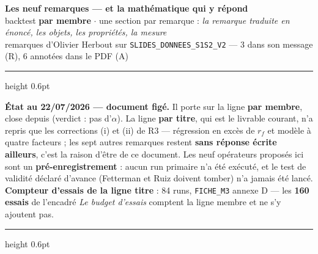 \documentclass[11pt,a4paper]{article}
\begin{document}
\begin{center}
{\LARGE\bfseries Les neuf remarques --- et la mathématique qui y répond}\\[1mm]
{\normalsize backtest \textbf{par membre} $\cdot$ une section par remarque : \emph{la remarque traduite en énoncé, les objets, les propriétés, la mesure}}\\[0.5mm]
{\small\color{grisf} remarques d'Olivier Herbout sur \texttt{SLIDES\_DONNEES\_S1S2\_V2} --- 3 dans son message (R), 6 annotées dans le PDF (A)}
\end{center}

\vspace{0.5mm}
\hrule height 0.6pt
\vspace{1mm}
{\footnotesize\color{grisf}\textbf{État au 22/07/2026 --- document figé.} Il porte sur la ligne
\textbf{par membre}, close depuis (verdict : pas d'$\alpha$). La ligne \textbf{par titre}, qui est le livrable
courant, n'a repris que les corrections (i) et (ii) de R3 --- régression en excès de $r_f$ et modèle à quatre
facteurs ; les sept autres remarques restent \textbf{sans réponse écrite ailleurs}, c'est la raison d'être de
ce document. Les neuf opérateurs proposés ici sont un \textbf{pré-enregistrement} : aucun run primaire n'a été
exécuté, et le test de validité déclaré d'avance (\og{}Fetterman et Ruiz doivent tomber\fg{}) n'a jamais été
lancé. \textbf{Compteur d'essais de la ligne titre} : 84 runs, \texttt{FICHE\_M3} annexe D --- les
\textbf{160 essais} de l'encadré \emph{Le budget d'essais} comptent la ligne membre et ne s'y ajoutent pas.\par}
\vspace{1mm}
\hrule height 0.6pt
\end{document}
